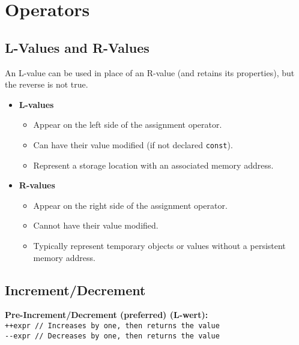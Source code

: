 






\section{Operators}
\subsection{L-Values and R-Values}

An L-value can be used in place of an R-value (and retains its properties), but the reverse is not true.

\begin{itemize}
    \item \textbf{L-values}
    \begin{itemize}
        \item Appear on the left side of the assignment operator.
        \item Can have their value modified (if not declared \texttt{const}).
        \item Represent a storage location with an associated memory address.
    \end{itemize}
    \item \textbf{R-values}
    \begin{itemize}
        \item Appear on the right side of the assignment operator.
        \item Cannot have their value modified.
        \item Typically represent temporary objects or values without a persistent memory address.
    \end{itemize}
\end{itemize}

\subsection{Increment/Decrement}

    \textbf{Pre-Increment/Decrement (preferred) (L-wert):}\\
        \lstinline[style=CodeExpert]{++expr // Increases by one, then returns the value} \\
       \lstinline[style=CodeExpert]{--expr // Decreases by one, then returns the value} 
    

